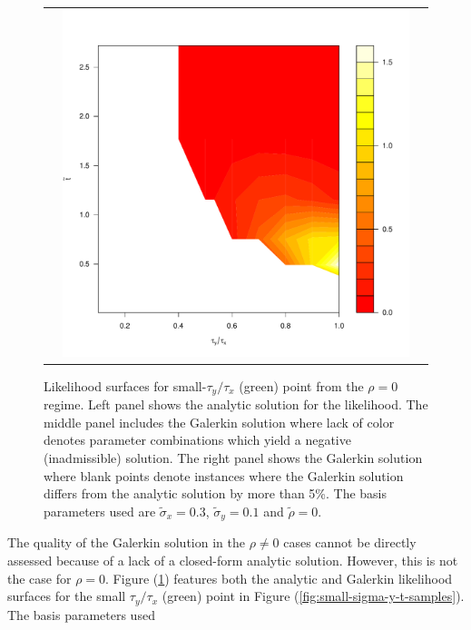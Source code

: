 \documentclass[10pt]{article}
\begin{document}
\begin{enumerate}
\begin{figure}
\begin{tabular}{ccc}
\begin{minipage}{0.33\textwidth}
    \end{minipage}
      & \begin{minipage}{0.33\textwidth}
      \includegraphics[width=1\linewidth]{small-sigma-Galerkin.pdf}
    \end{minipage}
  \end{tabular}
  \caption{Likelihood surfaces for small-$\tau_y/\tau_x$ (green) point
    from the $\rho = 0$ regime. Left panel shows the analytic solution
    for the likelihood. The middle panel includes the Galerkin
    solution where lack of color denotes parameter combinations which
    yield a negative (inadmissible) solution. The right panel shows
    the Galerkin solution where blank points denote instances where
    the Galerkin solution differs from the analytic solution by more
    than 5\%. The basis parameters used are $\tilde{\sigma}_x = 0.3$,
    $\tilde{\sigma}_y = 0.1$ and $\tilde{\rho} = 0$.}
  \label{fig:small-sigma-sol}
\end{figure}
The quality of the Galerkin solution in the $\rho \neq 0$ cases cannot
be directly assessed because of a lack of a closed-form analytic
solution. However, this is not the case for $\rho=0$. Figure
(\ref{fig:small-sigma-sol}) features both the analytic and Galerkin
likelihood surfaces for the small $\tau_y/\tau_x$ (green) point in
Figure (\ref{fig:small-sigma-y-t-samples}). The basis parameters used

\end{enumerate}
\end{document}
